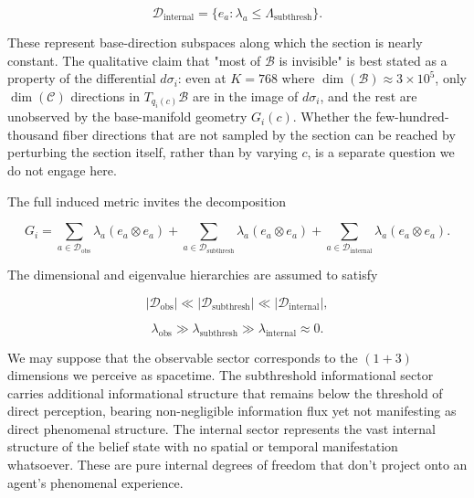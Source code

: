 \documentclass[11pt]{article}
\begin{document}
\begin{equation}
\mathcal{D}_{\text{internal}} = \{e_a : \lambda_a \leq \Lambda_{\text{subthresh}}\}.
\end{equation}

These represent base-direction subspaces along which the section is nearly constant. The qualitative claim that "most of $\mathcal{B}$ is invisible" is best stated as a property of the differential $d\sigma_i$: even at $K = 768$ where $\dim(\mathcal{B}) \approx 3\times 10^5$, only $\dim(\mathcal{C})$ directions in $T_{q_i(c)}\mathcal{B}$ are in the image of $d\sigma_i$, and the rest are unobserved by the base-manifold geometry $G_i(c)$. Whether the few-hundred-thousand fiber directions that are not sampled by the section can be reached by perturbing the section itself, rather than by varying $c$, is a separate question we do not engage here.

The full induced metric invites the decomposition

\begin{equation}
G_i = \sum_{a \in \mathcal{D}_{\text{obs}}} \lambda_a (e_a \otimes e_a)
+ \sum_{a \in \mathcal{D}_{\text{subthresh}}} \lambda_a (e_a \otimes e_a)
+ \sum_{a \in \mathcal{D}_{\text{internal}}} \lambda_a (e_a \otimes e_a).
\end{equation}

The dimensional and eigenvalue hierarchies are assumed to satisfy

\begin{equation}
|\mathcal{D}_{\text{obs}}| \ll |\mathcal{D}_{\text{subthresh}}| \ll |\mathcal{D}_{\text{internal}}|,
\end{equation}

\begin{equation}
\lambda_{\text{obs}} \gg \lambda_{\text{subthresh}} \gg \lambda_{\text{internal}} \approx 0.
\end{equation}

We may suppose that the observable sector corresponds to the $(1+3)$ dimensions we perceive as spacetime. The subthreshold informational sector carries additional informational structure that remains below the threshold of direct perception, bearing non-negligible information flux yet not manifesting as direct phenomenal structure. The internal sector represents the vast internal structure of the belief state with no spatial or temporal manifestation whatsoever. These are pure internal degrees of freedom that don't project onto an agent's phenomenal experience.
\end{document}
